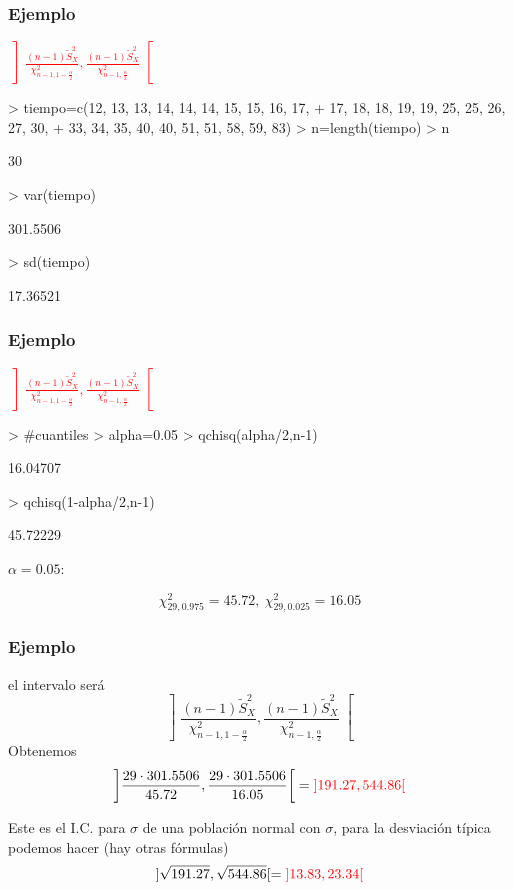 \documentclass[12pt,t]{beamer}
\newcommand{\red}[1]{\textcolor{red}{#1}}
\theoremstyle{plain}
\theoremstyle{definition}
\begin{document}
\begin{frame}[fragile]
\frametitle{Ejemplo}
\red{$\displaystyle \left] \frac{(n-1)\widetilde{S}_{X}^2}{\chi_{n-1,1-\frac{\alpha}{2}}^2},
\frac{(n-1)\widetilde{S}_{X}^2}{\chi_{n-1,\frac{\alpha}{2}}^2}
\right[$}
\begin{Schunk}
\begin{Sinput}
> tiempo=c(12, 13, 13, 14, 14, 14, 15, 15, 16, 17,
+          17, 18, 18, 19, 19, 25, 25, 26, 27, 30,
+          33, 34, 35, 40, 40, 51, 51, 58, 59, 83)
> n=length(tiempo)
> n
\end{Sinput}
\begin{Soutput}
[1] 30
\end{Soutput}
\begin{Sinput}
> var(tiempo)
\end{Sinput}
\begin{Soutput}
[1] 301.5506
\end{Soutput}
\begin{Sinput}
> sd(tiempo)
\end{Sinput}
\begin{Soutput}
[1] 17.36521
\end{Soutput}
\end{Schunk}
\end{frame}
 
\begin{frame}[fragile]
\frametitle{Ejemplo}
\red{$\displaystyle \left] \frac{(n-1)\widetilde{S}_{X}^2}{\chi_{n-1,1-\frac{\alpha}{2}}^2},
\frac{(n-1)\widetilde{S}_{X}^2}{\chi_{n-1,\frac{\alpha}{2}}^2}
\right[$}

\begin{Schunk}
\begin{Sinput}
> #cuantiles
> alpha=0.05
> qchisq(alpha/2,n-1)
\end{Sinput}
\begin{Soutput}
[1] 16.04707
\end{Soutput}
\begin{Sinput}
> qchisq(1-alpha/2,n-1)
\end{Sinput}
\begin{Soutput}
[1] 45.72229
\end{Soutput}
\end{Schunk}
\medskip


$\alpha=0.05$:

$$
\chi_{29,0.975}^2=45.72,\
\chi_{29,0.025}^2=16.05
$$
\end{frame}

\begin{frame} 
\frametitle{Ejemplo}

el intervalo será
$$
\left] \frac{(n-1)\widetilde{S}_{X}^2}{\chi_{n-1,1-\frac{\alpha}{2}}^2},
\frac{(n-1)\widetilde{S}_{X}^2}{\chi_{n-1,\frac{\alpha}{2}}^2}
\right[
$$
Obtenemos
$$
\left] \frac{29\cdot 301.5506}{45.72},
\frac{29\cdot 301.5506}{16.05}
\right[=
\red{]191.27, 544.86[}
$$

Este  es el I.C. para $\sigma$ de una población normal con $\sigma$, para la desviación típica podemos hacer (hay otras fórmulas) 
$$
]\sqrt{191.27}, \sqrt{544.86}[=\red{]13.83,23.34[}
$$

\end{frame}
\end{document}
